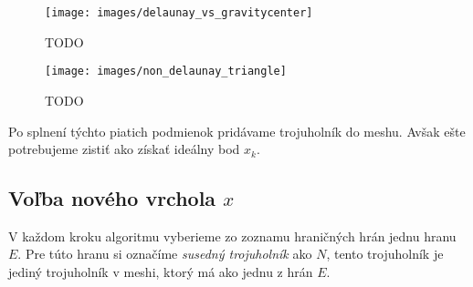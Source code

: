 \begin{enumerate}
    \begin{figure}
        \centerline{\texttt{[image: images/delaunay\_vs\_gravitycenter]}}
        \caption[]{TODO}
        \label{obr:delaunay_vs_gravitycenter}
    \end{figure}

    \begin{figure}
        \centerline{\texttt{[image: images/non\_delaunay\_triangle]}}
        \caption[]{TODO}
        \label{obr:non_delaunay_triangle}
    \end{figure}
\end{enumerate}

Po splnení týchto piatich podmienok pridávame trojuholník do meshu. Avšak ešte potrebujeme zistiť 
ako získať ideálny bod $x_k$.

\subsection{Voľba nového vrchola $x$}

V každom kroku algoritmu vyberieme zo zoznamu hraničných hrán jednu hranu $E$. Pre túto hranu si 
označíme \textit{susedný trojuholník} ako $N$, tento trojuholník je jediný trojuholník v meshi, 
ktorý má ako jednu z hrán $E$. 

